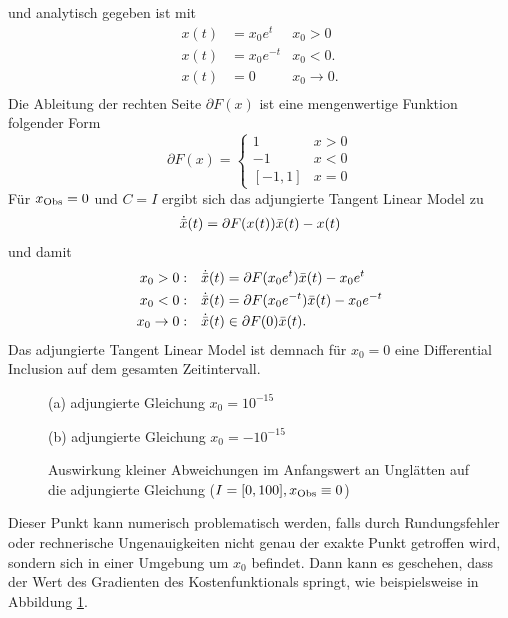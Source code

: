 und analytisch gegeben ist mit 
\[
 \begin{aligned}
  x(t) &= x_0 e^t &x_0>0\\
  x(t) &= x_0 e^{-t} &x_0<0.\\
  x(t) &= 0 &x_0\to 0.\\
 \end{aligned}
\]
Die Ableitung der rechten Seite $\partial F(x)$ ist eine mengenwertige Funktion folgender Form
\[
\partial F(x) = \begin{cases}
          1 & x>0\\
         -1 &x<0\\
          [-1,1] & x=0
         \end{cases}
\]
Für $x_{\text{Obs}} = 0$ und $C=I$ ergibt sich das adjungierte Tangent Linear Model zu
\[
 \begin{aligned}
  \dot {\bar{x}}(t)  &= \partial F(x(t)) \bar{x}(t) - x(t) \\ 
 \end{aligned}
\]
und damit 
\[
 \begin{aligned}
  x_0>0: &&  \dot {\bar{x}}(t)  &= \partial F(x_0e^t) \bar{x}(t) - x_0e^t \\ 
  x_0<0: &&  \dot {\bar{x}}(t)  &= \partial F(x_0e^{-t}) \bar{x}(t) - x_0e^{-t} \\ 
  x_0\to 0:&& \dot {\bar{x}}(t)  &\in \partial F(0) \bar{x}(t). \\ 
 \end{aligned}
\]
Das adjungierte Tangent Linear Model ist demnach für $x_0=0$ eine Differential Inclusion auf dem gesamten Zeitintervall.

\begin{figure}[H]
\footnotesize
\centering
\begin{minipage}[b]{0.49\linewidth}
\centering

\caption*{(a) adjungierte Gleichung $x_0=10^{-15}$}
\end{minipage}
\begin{minipage}[b]{0.49\linewidth}
\centering

\caption*{(b) adjungierte Gleichung $x_0=-10^{-15}$}
\end{minipage}
\caption{Auswirkung kleiner Abweichungen im Anfangswert an Unglätten auf die adjungierte Gleichung ($I=[0,100], x_{\text{Obs}} \equiv 0$)}
\label{fig:babyExampleAdjEq}
\end{figure}

Dieser Punkt kann numerisch problematisch werden, falls durch Rundungsfehler oder rechnerische Ungenauigkeiten nicht genau der exakte Punkt getroffen wird, sondern sich in einer Umgebung um $x_0$ befindet. Dann kann es geschehen, dass der Wert des Gradienten des Kostenfunktionals springt, wie beispielsweise in Abbildung \ref{fig:babyExampleAdjEq}.

